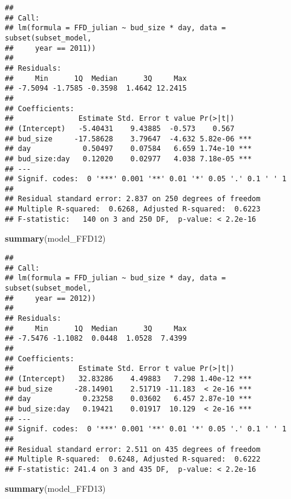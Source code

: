 \documentclass[]{article}
\newenvironment{Shaded}{\begin{snugshade}}{\end{snugshade}}
\newcommand{\KeywordTok}[1]{\textcolor[rgb]{0.13,0.29,0.53}{\textbf{#1}}}
\newcommand{\NormalTok}[1]{#1}
\begin{document}
\begin{verbatim}
## 
## Call:
## lm(formula = FFD_julian ~ bud_size * day, data = subset(subset_model, 
##     year == 2011))
## 
## Residuals:
##     Min      1Q  Median      3Q     Max 
## -7.5094 -1.7585 -0.3598  1.4642 12.2415 
## 
## Coefficients:
##               Estimate Std. Error t value Pr(>|t|)    
## (Intercept)   -5.40431    9.43885  -0.573    0.567    
## bud_size     -17.58628    3.79647  -4.632 5.82e-06 ***
## day            0.50497    0.07584   6.659 1.74e-10 ***
## bud_size:day   0.12020    0.02977   4.038 7.18e-05 ***
## ---
## Signif. codes:  0 '***' 0.001 '**' 0.01 '*' 0.05 '.' 0.1 ' ' 1
## 
## Residual standard error: 2.837 on 250 degrees of freedom
## Multiple R-squared:  0.6268, Adjusted R-squared:  0.6223 
## F-statistic:   140 on 3 and 250 DF,  p-value: < 2.2e-16
\end{verbatim}

\begin{Shaded}
\begin{Highlighting}[]
\KeywordTok{summary}\NormalTok{(model_FFD12)}
\end{Highlighting}
\end{Shaded}

\begin{verbatim}
## 
## Call:
## lm(formula = FFD_julian ~ bud_size * day, data = subset(subset_model, 
##     year == 2012))
## 
## Residuals:
##     Min      1Q  Median      3Q     Max 
## -7.5476 -1.1082  0.0448  1.0528  7.4399 
## 
## Coefficients:
##               Estimate Std. Error t value Pr(>|t|)    
## (Intercept)   32.83286    4.49883   7.298 1.40e-12 ***
## bud_size     -28.14901    2.51719 -11.183  < 2e-16 ***
## day            0.23258    0.03602   6.457 2.87e-10 ***
## bud_size:day   0.19421    0.01917  10.129  < 2e-16 ***
## ---
## Signif. codes:  0 '***' 0.001 '**' 0.01 '*' 0.05 '.' 0.1 ' ' 1
## 
## Residual standard error: 2.511 on 435 degrees of freedom
## Multiple R-squared:  0.6248, Adjusted R-squared:  0.6222 
## F-statistic: 241.4 on 3 and 435 DF,  p-value: < 2.2e-16
\end{verbatim}

\begin{Shaded}
\begin{Highlighting}[]
\KeywordTok{summary}\NormalTok{(model_FFD13)}
\end{Highlighting}
\end{Shaded}
\end{document}
